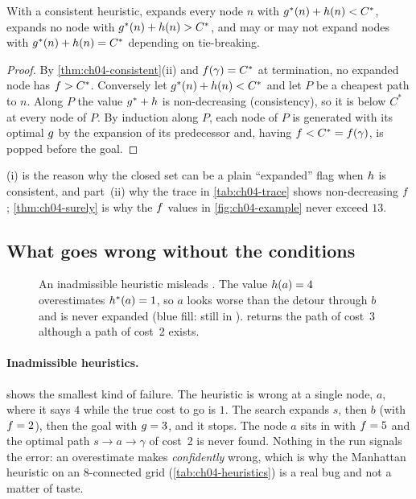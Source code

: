 \begin{corollary}
\label{thm:ch04-surely}
With a consistent heuristic, \astar expands every node $n$ with
$g^*(n) + h(n) < C^*$, expands no node with $g^*(n) + h(n)
> C^*$, and may or may not expand nodes with $g^*(n) + h(n) = C^*$
depending on tie-breaking.
\end{corollary}
\begin{proof}
By \cref{thm:ch04-consistent}(ii) and $f(\gamma) = C^*$ at termination, no
expanded node has $f > C^*$. Conversely let $g^*(n) + h(n) <
C^*$ and let $P$ be a cheapest path to $n$. Along $P$ the value
$g^* + h$ is non-decreasing (consistency), so it is below $C^*$ at
every node of $P$. By induction along $P$, each node of $P$ is generated with
its optimal $g$ by the expansion of its predecessor and, having
$f < C^* = f(\gamma)$, is popped before the goal.
\end{proof}

(i) is the reason why the closed set can be a plain
``expanded'' flag when $h$ is consistent, and part~(ii) why the trace in
\cref{tab:ch04-trace} shows non-decreasing $f$;
\cref{thm:ch04-surely} is why the $f$ values in \cref{fig:ch04-example}
never exceed $13$.

\subsection{What goes wrong without the conditions}

\begin{figure}[tb]
  \centering
  \caption{An inadmissible heuristic misleads \astar. The value $h(a) = 4$
  overestimates $h^*(a) = 1$, so $a$ looks worse than the detour through
  $b$ and is never expanded (blue fill: still in \Open). \astar returns the path
  of cost~3 although a path of cost~2 exists.}
  \label{fig:ch04-inadmissible}
\end{figure}

\paragraph{Inadmissible heuristics.}
 shows the smallest kind of failure. The heuristic
is wrong at a single node, $a$, where it says $4$ while the true cost to go is
$1$. The search expands $s$, then $b$ (with $f = 2$), then the goal with
$g = 3$, and it stops. The node $a$ sits in \Open with $f = 5$ and
the optimal path $s \to a \to \gamma$ of cost~2 is never found. Nothing in the
run signals the error: an overestimate makes \astar \emph{confidently} wrong,
which is why the Manhattan heuristic on an 8-connected grid
(\cref{tab:ch04-heuristics}) is a real bug and not a matter of taste.


